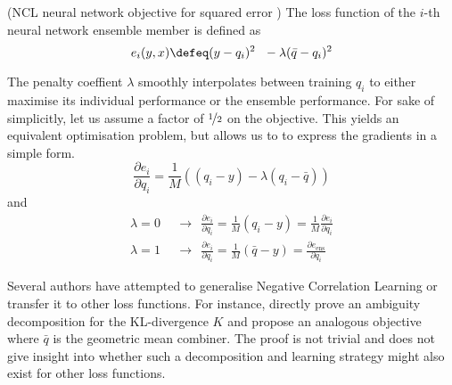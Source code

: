 \documentclass[../main.tex]{subfiles}
\begin{document}
\begin{definition} (NCL neural network objective for squared error \cite{brown_ManagingDiversityRegression_2005}) The loss function of the $i$-th neural network ensemble member is defined as
$$
e_{i}(y,x) \defeq (y - q_i)^2 ~ ~ - \lambda (\bar{q} - q_i)^2
$$
\end{definition}
The penalty coeffient $\lambda$ smoothly interpolates between training $q_{i}$ to either maximise its individual performance or the ensemble performance. For sake of simplicitly, let us assume a factor of $\nicefrac{1}{2}$ on the objective. This yields an equivalent optimisation problem, but allows us to to express the gradients in a simple form.
$$
\frac{\partial e_{i}}{\partial q_{i}} = \frac{1}{M}
\left(
(q_{i}-y) - \lambda (q_{i} - \bar{q})
\right)
$$
and
$$
\begin{align}
\lambda = 0 ~~&\rightarrow~~ \frac{\partial e_{i}}{\partial q_{i}} = \frac{1}{M}(q_{i}-y) = \frac{1}{M} \frac{\partial e_{i}}{\partial q_{i}} \\
\lambda = 1 ~~&\rightarrow~~ \frac{\partial e_{i}}{\partial q_{i}} = \frac{1}{M}(\bar{q} - y) = \frac{\partial e_{\text{ens}}}{\partial q_{i}}
\end{align}
$$

Several authors have attempted to generalise Negative Correlation Learning or transfer it to other loss functions. For instance, \citeauthor{webb_EnsembleNotEnsemble_2019} \cite{webb_EnsembleNotEnsemble_2019} directly prove an ambiguity decomposition for the KL-divergence $K$ and propose an analogous objective
where $\bar{q}$ is the geometric mean combiner. The proof is not trivial and does not give insight into whether such a decomposition and learning strategy might also exist for other loss functions.
\end{document}
